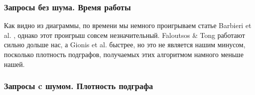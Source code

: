 \subsubsection{Запросы без шума. Время работы}

  \begin{center}
  \end{center}

Как видно из диаграммы, по времени мы немного проигрываем статье Barbieri et al. \cite{Barbieri15}, однако этот проигрыш совсем незначительный. Faloutsos \& Tong \cite{Faloutsos06} работают сильно дольше нас, а Gionis et al. \cite{Gionis15} быстрее, но это не является нашим минусом, посколько плотность подграфов, получаемых этих алгоритмом намного меньше нашей.

\subsubsection{Запросы c шумом. Плотность подграфа}

  \begin{center}
  \end{center}


